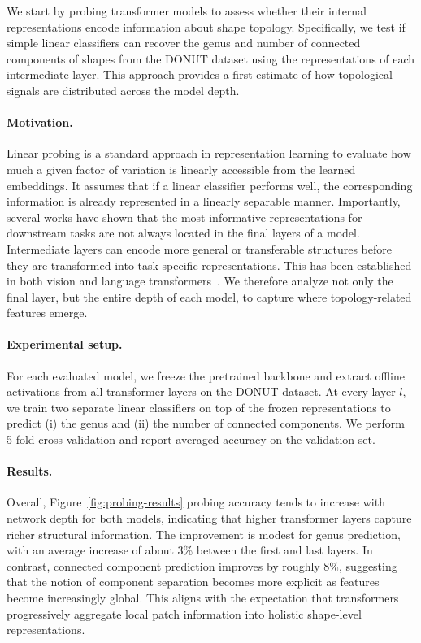 We start by probing transformer models to assess whether their internal representations encode information about shape topology. Specifically, we test if simple linear classifiers can recover the genus and number of connected components of shapes from the DONUT dataset using the representations of each intermediate layer. This approach provides a first estimate of how topological signals are distributed across the model depth.

\paragraph{Motivation.}
Linear probing is a standard approach in representation learning to evaluate how much a given factor of variation is linearly accessible from the learned embeddings. It assumes that if a linear classifier performs well, the corresponding information is already represented in a linearly separable manner. Importantly, several works have shown that the most informative representations for downstream tasks are not always located in the final layers of a model. Intermediate layers can encode more general or transferable structures before they are transformed into task-specific representations. This has been established in both vision and language transformers~\cite{intermediate_layers, structural_probe, vit_probing}. We therefore analyze not only the final layer, but the entire depth of each model, to capture where topology-related features emerge.

\paragraph{Experimental setup.}
For each evaluated model, we freeze the pretrained backbone and extract offline activations from all transformer layers on the DONUT dataset. At every layer $l$, we train two separate linear classifiers on top of the frozen representations to predict (i) the genus and (ii) the number of connected components. We perform 5-fold cross-validation and report averaged accuracy on the validation set.

\paragraph{Results.}
Overall, Figure~\ref{fig:probing-results} probing accuracy tends to increase with network depth for both models, indicating that higher transformer layers capture richer structural information. The improvement is modest for genus prediction, with an average increase of about 3\% between the first and last layers. In contrast, connected component prediction improves by roughly 8\%, suggesting that the notion of component separation becomes more explicit as features become increasingly global. This aligns with the expectation that transformers progressively aggregate local patch information into holistic shape-level representations.

